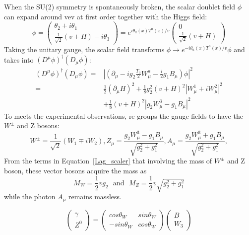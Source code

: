 When the SU(2) symmetry is spontaneously broken, the scalar doublet field $\phi$ can expand around vev at first order together with the Higgs field:
\begin{equation}
\phi=
\begin{pmatrix}
\theta_{2}+i\theta_{1} \\
\frac{1}{\sqrt{2}}(v+H)-i\theta_{3}
\end{pmatrix}
=e^{i\theta_{a}(x)T^{a}(x)/v}
\begin{pmatrix}
0\\
\frac{1}{\sqrt{2}}(v+H)
\end{pmatrix}
\end{equation}
Taking the unitary gauge, the scalar field transforms $\phi \to e^{-i\theta_{a}(x)T^{a}(x)/v}\phi$ and takes into $(D^{\mu}\phi)^{\dagger}(D_{\mu}\phi)$:
\begin{equation}\label{Lag_scaler}
\begin{aligned}
(D^{\mu}\phi)^{\dagger}(D_{\mu}\phi)=&|(\partial_{\mu}-ig_{2}\frac{T_{a}}{2}W^{a}_{\mu}-\frac{i}{2}g_{1}B_{\mu})\phi|^{2}\\
                                                          =&\frac{1}{2}(\partial_{\mu}H)^{2}+\frac{1}{8}g^{2}_{2}(v+H)^{2}|W^{1}_{\mu}+iW^{2}_{\mu}|^{2}\\
                                                            &+\frac{1}{8}(v+H)^{2}|g_{2}W^{3}_{\mu}-g_{1}B_{\mu}|^{2}
\end{aligned}
\end{equation}
To meets the experimental observations, re-groups the gauge fields to have the $W^{\pm}$ and Z bosons: 
\begin{equation}
W^{\pm}=\frac{1}{\sqrt{2}}(W_{1}\mp iW_{2}), Z_{\mu}=\frac{g_{2}W^{3}_{\mu}-g_{1}B_{\mu}}{\sqrt{g_{2}^{2}+g^{2}_{1}}},A_{\mu}=\frac{g_{2}W^{3}_{\mu}+g_{1}B_{\mu}}{\sqrt{g_{2}^{2}+g^{2}_{1}}},
\end{equation}
From the terms in Equation~\ref{Lag_scaler} that involving the mass of $W^{\pm}$ and Z boson, these vector bosons acquire the mass as
\begin{equation}
M_{W}=\frac{1}{2}vg_{2}~~~\textrm{and}~~~M_{Z}=\frac{1}{2}v\sqrt{g^{2}_{2}+g^{2}_{1}}
\end{equation}
while the photon $A_{\mu}$ remains massless.




\[
\begin{pmatrix}
\gamma    \\
Z^{0}
\end{pmatrix}
=
\begin{pmatrix}
cos\theta_{W}  & sin\theta_{W} \\
-sin\theta_{W}  & cos\theta_{W}
\end{pmatrix}
\begin{pmatrix}
B\\
W_{3}
\end{pmatrix}
\]


